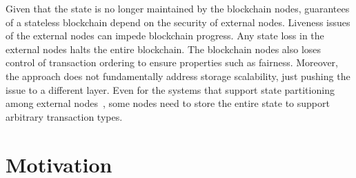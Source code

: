 Given that the state is no longer maintained by the blockchain nodes, guarantees of a stateless blockchain depend on the security of external nodes.
Liveness issues of the external nodes can impede blockchain progress.
Any state loss in the external nodes halts the entire blockchain.
The blockchain nodes also loses control of transaction ordering to ensure properties such as fairness.
Moreover, the approach does not fundamentally address storage scalability, just pushing the issue to a different layer.
Even for the systems that support state partitioning among external nodes~\cite{xu2021slimchain}, some nodes need to store the entire state to support arbitrary transaction types.



\section{Motivation}

